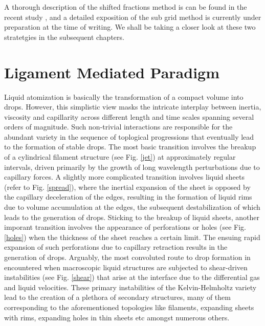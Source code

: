 A thorough description of the shifted fractions method is can be found in
the recent study  , and a detailed exposition of the sub grid method 
is currently under preparation at the time of writing.  
We shall be taking a closer look at these two stratetgies in the subsequent chapters.  

\section*{Ligament Mediated Paradigm}

Liquid atomization is basically the transformation of a compact volume into drops.
However, this simplistic view masks the intricate interplay between inertia, viscosity and capillarity across 
different length and time scales spanning several orders of magnitude.  
Such non-trivial interactions are responsible for the abundant variety in the sequence 
of toplogical progressions that eventually lead to the formation of stable drops. 
The most basic transition involves the breakup of a cylindrical filament structure 
(see Fig. \ref{jet}) at approximately regular intervals, driven primarily by the 
growth of long wavelength perturbations due to capillary forces. 
A slightly more complicated transition involves liquid sheets (refer to Fig. \ref{spread}), 
where the inertial expansion of the sheet is opposed by the capillary deceleration of the edges,
resulting in the formation of liquid rims due to volume accumulation at the edges, 
the subsequent destabilization of which leads to the generation of drops. 
Sticking to the breakup of liquid sheets, another imporant transition involves the  
appearance of perforations or holes (see Fig. \ref{holes}) when the thickness of the sheet reaches a certain limit. 
The ensuing rapid expansion of such perforations due to capillary retraction results in the generation of drops. 
Arguably, the most convoluted route to drop formation in encountered when macroscopic 
liquid structures are subjected to shear-driven instabilities (see Fig. \ref{shear}) that 
arise at the interface due to the differential gas and liquid velocities. 
These primary instabilities of the Kelvin-Helmholtz \cite{khi} variety lead to the creation 
of a plethora of secondary structures, many of them corresponding to the aforementioned 
topologies like filaments, expanding sheets with rims, expanding holes in thin sheets etc amongst numerous others. 

